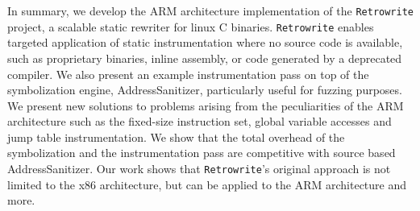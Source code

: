 \documentclass[a4paper,11pt,oneside]{report}
\begin{document}
In summary, we develop the ARM architecture implementation of the 
\texttt{Retrowrite} project, a scalable static rewriter for linux C binaries.  
\texttt{Retrowrite} enables targeted application of static instrumentation 
where no source code is available, such as proprietary binaries, inline 
assembly, or code generated by a deprecated compiler.  We also present an 
example instrumentation pass on top of the symbolization engine, 
AddressSanitizer, particularly useful for fuzzing purposes. We present new 
solutions to problems arising from the peculiarities of the ARM architecture 
such as the fixed-size instruction set, global variable accesses and jump table 
instrumentation. We show that the total overhead of the symbolization and the 
instrumentation pass are competitive with source based AddressSanitizer.  Our 
work shows that \texttt{Retrowrite}'s original approach is not limited to the 
x86 architecture, but can be applied to the ARM architecture and more.



\cleardoublepage
{}

\printbibliography

%
%
\end{document}
